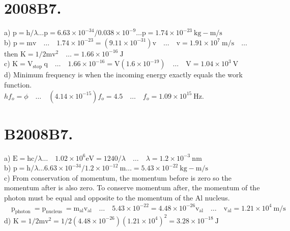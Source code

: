 \begin{enumerate}
\section*{2008B7.}
a) $\mathrm{p}=\mathrm{h} / \lambda \ldots \mathrm{p}=6.63 \times 10^{-34} / 0.038 \times 10^{-9} \ldots \mathrm{p}=1.74 \times 10^{-23} \mathrm{~kg}-\mathrm{m} / \mathrm{s}$\\
b) $\mathrm{p}=\mathrm{mv} \quad \ldots \quad 1.74 \times 10^{-23}=\left(9.11 \times 10^{-31}\right) \mathrm{v} \quad \ldots \quad \mathrm{v}=1.91 \times 10^{7} \mathrm{~m} / \mathrm{s} \quad \ldots \quad$ then $\mathrm{K}=1 / 2 \mathrm{mv}^{2} \quad \ldots=1.66 \times 10^{-16} \mathrm{~J}$\\
c) $\mathrm{K}=\mathrm{V}_{\text {stop }} \mathrm{q} \quad \ldots \quad 1.66 \times 10^{-16}=\mathrm{V}\left(1.6 \times 10^{-19}\right) \quad \ldots \quad \mathrm{V}=1.04 \times 10^{3} \mathrm{~V}$\\
d) Minimum frequency is when the incoming energy exactly equals the work function.\\
$h f_{o}=\phi \quad \ldots \quad\left(4.14 \times 10^{-15}\right) f_{o}=4.5 \quad \ldots \quad f_{o}=1.09 \times 10^{15} \mathrm{~Hz}$.

\section*{B2008B7.}
a) $\mathrm{E}=\mathrm{hc} / \lambda \ldots \quad 1.02 \times 10^{6} \mathrm{eV}=1240 / \lambda \quad \ldots \quad \lambda=1.2 \times 10^{-3} \mathrm{~nm}$\\
b) $\mathrm{p}=\mathrm{h} / \lambda \ldots 6.63 \times 10^{-34} / 1.2 \times 10^{-12} \mathrm{~m} \ldots=5.43 \times 10^{-22} \mathrm{~kg}-\mathrm{m} / \mathrm{s}$\\
c) From conservation of momentum, the momentum before is zero so the momentum after is also zero. To conserve momentum after, the momentum of the photon must be equal and opposite to the momentum of the Al nucleus. $\quad \mathrm{p}_{\text {photon }}=\mathrm{p}_{\text {nucleus }}=\mathrm{m}_{\mathrm{al}} \mathrm{v}_{\mathrm{al}} \quad \ldots \quad 5.43 \times 10^{-22}=4.48 \times 10^{-26} \mathrm{v}_{\mathrm{al}} \quad \ldots \quad \mathrm{v}_{\mathrm{al}}=1.21 \times 10^{4} \mathrm{~m} / \mathrm{s}$\\
d) $\mathrm{K}=1 / 2 \mathrm{mv}^{2}=1 / 2\left(4.48 \times 10^{-26}\right)\left(1.21 \times 10^{4}\right)^{2}=3.28 \times 10^{-18} \mathrm{~J}$


\end{enumerate}

